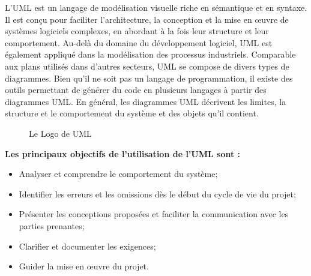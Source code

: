 \vspace{1cm}

L'UML est un langage de modélisation visuelle riche en sémantique et en syntaxe. Il est conçu pour faciliter l'architecture, la conception et la mise en œuvre de systèmes logiciels complexes, en abordant à la fois leur structure et leur comportement. Au-delà du domaine du développement logiciel, UML est également appliqué dans la modélisation des processus industriels. Comparable aux plans utilisés dans d'autres secteurs, UML se compose de divers types de diagrammes. Bien qu'il ne soit pas un langage de programmation, il existe des outils permettant de générer du code en plusieurs langages à partir des diagrammes UML. En général, les diagrammes UML décrivent les limites, la structure et le comportement du système et des objets qu'il contient.\cite{b24}

\begin{figure}[H]
\centering
{}
\caption{Le Logo de UML}
\end{figure}

\textbf{Les principaux objectifs de l'utilisation de l'UML sont :}
\begin{itemize}
    \item Analyser et comprendre le comportement du système;
    \item Identifier les erreurs et les omissions dès le début du cycle de vie du projet;
    \item Présenter les conceptions proposées et faciliter la communication avec les parties prenantes;
    \item Clarifier et documenter les exigences;
    \item Guider la mise en œuvre du projet.
\end{itemize}

\vspace{1cm}


